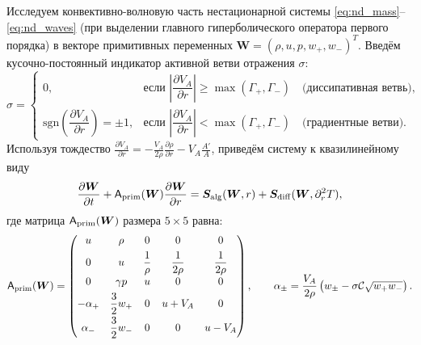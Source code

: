 \documentclass[11pt,a4paper]{article}
\begin{document}
Исследуем конвективно-волновую часть нестационарной системы \eqref{eq:nd_mass}--\eqref{eq:nd_waves} (при выделении главного гиперболического оператора первого порядка) в векторе примитивных переменных $\bm{W} = (\rho, u, p, w_+, w_-)^T$. Введём кусочно-постоянный индикатор активной ветви отражения $\sigma$:
\begin{equation}
\sigma =
\begin{cases}
0, & \text{если } \left|\dfrac{\partial V_A}{\partial r}\right| \ge \max(\Gamma_+,\Gamma_-) \quad \text{(диссипативная ветвь)},\\[8pt]
\mathrm{sgn}\left(\dfrac{\partial V_A}{\partial r}\right) = \pm 1, & \text{если } \left|\dfrac{\partial V_A}{\partial r}\right| < \max(\Gamma_+,\Gamma_-) \quad \text{(градиентные ветви)}.
\end{cases}
\label{eq:sigma_branch}
\end{equation}
Используя тождество $\frac{\partial V_A}{\partial r} = -\frac{V_A}{2\rho}\frac{\partial\rho}{\partial r} - V_A\frac{A'}{A}$, приведём систему к квазилинейному виду
\begin{equation}
\frac{\partial\bm{W}}{\partial t} + \mathsf{A}_{\rm prim}(\bm{W})\frac{\partial\bm{W}}{\partial r} = \bm{S}_{\rm alg}(\bm{W}, r) + \bm{S}_{\rm diff}(\bm{W}, \partial_r^2 T),
\label{eq:quasilinear_form}
\end{equation}
где матрица $\mathsf{A}_{\rm prim}(\bm{W})$ размера $5 \times 5$ равна:
\begin{equation}
\mathsf{A}_{\rm prim}(\bm{W}) =
\begin{pmatrix}
u & \rho & 0 & 0 & 0 \\[4pt]
0 & u & \dfrac{1}{\rho} & \dfrac{1}{2\rho} & \dfrac{1}{2\rho} \\[6pt]
0 & \gamma p & u & 0 & 0 \\[4pt]
-\alpha_+ & \dfrac{3}{2}w_+ & 0 & u + V_A & 0 \\[6pt]
\alpha_- & \dfrac{3}{2}w_- & 0 & 0 & u - V_A
\end{pmatrix}, \qquad
\alpha_\pm = \frac{V_A}{2\rho}\left(w_\pm - \sigma\mathcal{C}\sqrt{w_+ w_-}\right).
\label{eq:A_prim}
\end{equation}
\end{document}
